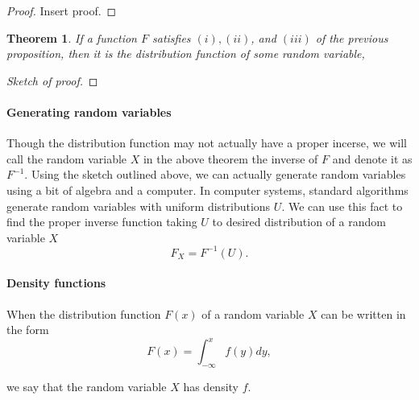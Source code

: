 \documentclass[12pt]{article}
\newtheorem{thm}{Theorem}[section]
\theoremstyle{definition}
\theoremstyle{remark}
\numberwithin{equation}{section}
\begin{document}
\begin{proof}
  Insert proof.
\end{proof}

\begin{thm}
  If a function $F$ satisfies $(i), (ii)$, and $(iii)$ of the previous proposition, then it is the distribution function of some random variable,
\end{thm}
\begin{proof}[Sketch of proof]
  
\end{proof}

\paragraph{Generating random variables}%
\label{par:generating_random_variables}

Though the distribution function may not actually have a proper incerse, we will call the random variable $X$ in the above theorem the inverse of $F$ and denote it as $F^{-1}$. Using the sketch outlined above, we can actually generate random variables using a bit of algebra and a computer. In computer systems, standard algorithms generate random variables with uniform distributions $U$. We can use this fact to find the proper inverse function taking $U$ to desired distribution of a random variable $X$
\begin{equation}
  F_X = F^{-1}(U).
\end{equation}


\paragraph{Density functions}%
\label{par:density_functions}

When the distribution function $F(x)$ of a random variable $X$ can be written in the form
\begin{equation}
  F(x) = \int_{-\infty}^{x} f(y)dy,
\end{equation}

we say that the random variable $X$ has density $f$. 
\end{document}
